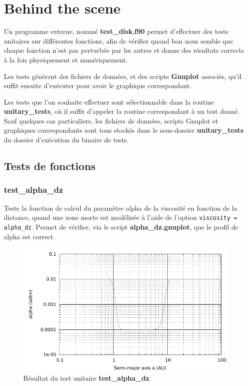 \section{Behind the scene}\label{sec:unitary_tests}
Un programme externe, nommé \textbf{test\_disk.f90} permet d'effectuer des tests unitaires sur différentes fonctions, afin de vérifier quand bon nous semble que chaque fonction n'est pas perturbée par les autres et donne des résultats corrects à la fois physiquement et numériquement.

Les tests génèrent des fichiers de données, et des scripts \textbf{Gnuplot} associés, qu'il suffit ensuite d'exécuter pour avoir le graphique correspondant. 

Les tests que l'on souhaite effectuer sont sélectionnable dans la routine \textbf{unitary\_tests}, où il suffit d'appeler la routine correspondant à un test donné. Sauf quelques cas particuliers, les fichiers de données, scripts Gnuplot et graphiques correspondants sont tous stockés dans le sous-dossier \textbf{unitary\_tests} du dossier d'exécution du binaire de tests.

\subsection{Tests de fonctions}
\subsubsection{test\_alpha\_dz}
Teste la fonction de calcul du paramètre alpha de la viscosité en fonction de la distance, quand une zone morte est modélisée à l'aide de l'option \verb|viscosity = alpha_dz|. Permet de vérifier, via le script \textbf{alpha\_dz.gnuplot}, que le profil de alpha est correct.


\begin{figure}[htbp]
\centering
\includegraphics[width=0.65\linewidth]{figure/unitary_tests/alpha_dz.pdf}
\caption{Résultat du test unitaire \textbf{test\_alpha\_dz}.}
\end{figure}


